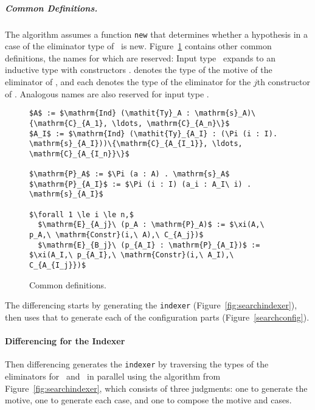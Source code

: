 
\subparagraph*{Common Definitions.}
The algorithm assumes a function \lstinline{new} that determines whether a hypothesis in a case of the eliminator type of \AI\ is new.
Figure~\ref{fig:common} contains other common definitions, the names for which are reserved:
Input type \Aa\ expands to an inductive type with constructors
.
 denotes the type of the motive of the eliminator of \Aa,
and each  denotes the type of the eliminator for the $j$th constructor of \Aa.
Analogous names are also reserved for input type \AI.

\begin{figure}
\begin{lstlisting}
$A$ := $\mathrm{Ind} (\mathit{Ty}_A : \mathrm{s}_A)\{\mathrm{C}_{A_1}, \ldots, \mathrm{C}_{A_n}\}$
$A_I$ := $\mathrm{Ind} (\mathit{Ty}_{A_I} : (\Pi (i : I). \mathrm{s}_{A_I}))\{\mathrm{C}_{A_{I_1}}, \ldots, \mathrm{C}_{A_{I_n}}\}$

$\mathrm{P}_A$ := $\Pi (a : A) . \mathrm{s}_A$
$\mathrm{P}_{A_I}$ := $\Pi (i : I) (a_i : A_I\ i) . \mathrm{s}_{A_I}$

$\forall 1 \le i \le n,$
  $\mathrm{E}_{A_j}\ (p_A : \mathrm{P}_A)$ := $\xi(A,\ p_A,\ \mathrm{Constr}(i,\ A),\ C_{A_j})$
  $\mathrm{E}_{B_j}\ (p_{A_I} : \mathrm{P}_{A_I})$ := $\xi(A_I,\ p_{A_I},\ \mathrm{Constr}(i,\ A_I),\ C_{A_{I_j}})$
\end{lstlisting}
\vspace{-0.3cm}
\caption{Common definitions.}
\label{fig:common}
\end{figure}

The differencing starts by generating the \lstinline{indexer} (Figure~\ref{fig:searchindexer}),
then uses that to generate each of the configuration parts (Figure~\ref{searchconfig}).

\paragraph{Differencing for the Indexer}
Then differencing generates the \lstinline{indexer} by traversing the types of the eliminators for \Aa\ and \AI\ in parallel using the algorithm from Figure~\ref{fig:searchindexer},
which consists of three judgments: one to generate the motive, one to generate each case,
and one to compose the motive and cases.

